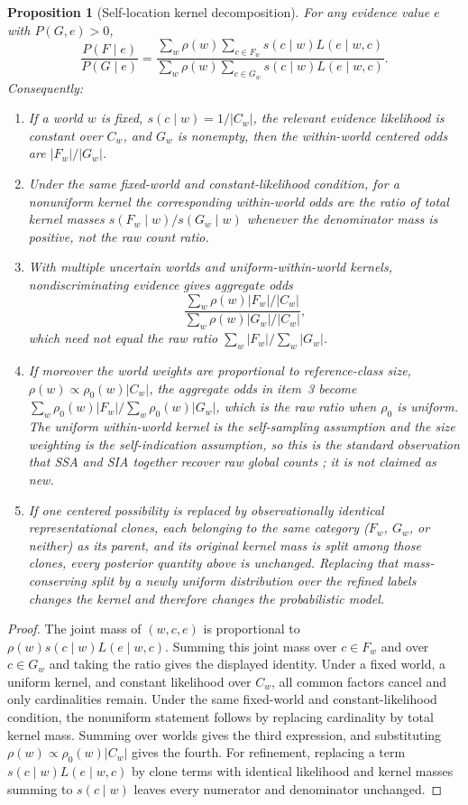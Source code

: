 \documentclass[11pt]{article}
\newtheorem{proposition}{Proposition}
\begin{document}
\begin{proposition}[Self-location kernel decomposition]\label{prop:selflocation}
For any evidence value $e$ with $P(G,e)>0$,
\[
\frac{P(F\mid e)}{P(G\mid e)}
=
\frac{\sum_w\rho(w)\sum_{c\in F_w}s(c\mid w)L(e\mid w,c)}
{\sum_w\rho(w)\sum_{c\in G_w}s(c\mid w)L(e\mid w,c)}.
\]
Consequently:
\begin{enumerate}
\item If a world $w$ is fixed, $s(c\mid w)=1/|C_w|$, the relevant evidence likelihood is constant over $C_w$, and $G_w$ is nonempty, then the within-world centered odds are $|F_w|/|G_w|$.
\item Under the same fixed-world and constant-likelihood condition, for a nonuniform kernel the corresponding within-world odds are the ratio of total kernel masses $s(F_w\mid w)/s(G_w\mid w)$ whenever the denominator mass is positive, not the raw count ratio.
\item With multiple uncertain worlds and uniform-within-world kernels, nondiscriminating evidence gives aggregate odds
\[
\frac{\sum_w\rho(w)|F_w|/|C_w|}{\sum_w\rho(w)|G_w|/|C_w|},
\]
which need not equal the raw ratio $\sum_w|F_w|/\sum_w|G_w|$.
\item If moreover the world weights are proportional to reference-class size, $\rho(w)\propto\rho_0(w)|C_w|$, the aggregate odds in item~3 become $\sum_w\rho_0(w)|F_w|\big/\sum_w\rho_0(w)|G_w|$, which is the raw ratio when $\rho_0$ is uniform. The uniform within-world kernel is the self-sampling assumption and the size weighting is the self-indication assumption, so this is the standard observation that SSA and SIA together recover raw global counts \citep{bostrom2002,olum2002,bostromcirkovic2003}; it is not claimed as new.
\item If one centered possibility is replaced by observationally identical representational clones, each belonging to the same category ($F_w$, $G_w$, or neither) as its parent, and its original kernel mass is split among those clones, every posterior quantity above is unchanged. Replacing that mass-conserving split by a newly uniform distribution over the refined labels changes the kernel and therefore changes the probabilistic model.
\end{enumerate}
\end{proposition}

\begin{proof}
The joint mass of $(w,c,e)$ is proportional to $\rho(w)s(c\mid w)L(e\mid w,c)$. Summing this joint mass over $c\in F_w$ and over $c\in G_w$ and taking the ratio gives the displayed identity. Under a fixed world, a uniform kernel, and constant likelihood over $C_w$, all common factors cancel and only cardinalities remain. Under the same fixed-world and constant-likelihood condition, the nonuniform statement follows by replacing cardinality by total kernel mass. Summing over worlds gives the third expression, and substituting $\rho(w)\propto\rho_0(w)|C_w|$ gives the fourth. For refinement, replacing a term $s(c\mid w)L(e\mid w,c)$ by clone terms with identical likelihood and kernel masses summing to $s(c\mid w)$ leaves every numerator and denominator unchanged.
\end{proof}
\end{document}
